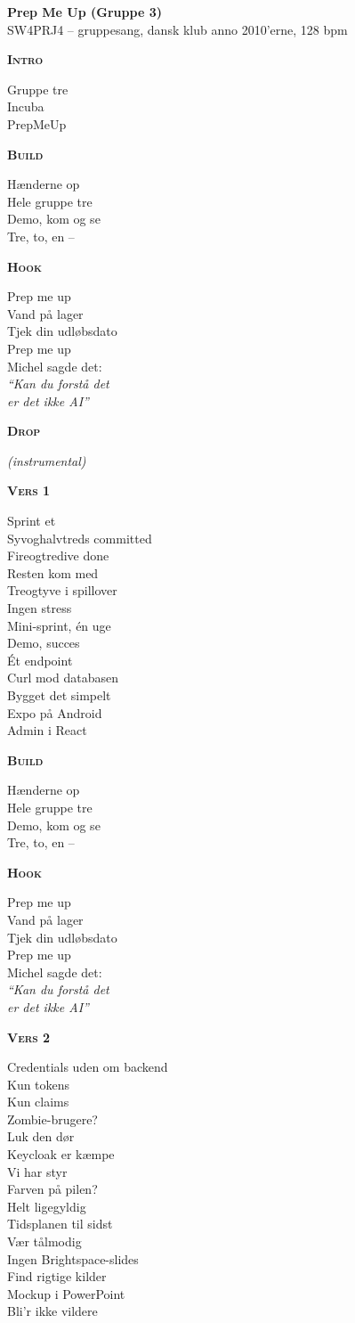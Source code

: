 \documentclass[a4paper,11pt]{article}
\newenvironment{songpart}[1]
    {\par\bigskip\noindent\begin{minipage}{\linewidth}\raggedright\textbf{\textsc{#1}}\par\smallskip}
    {\par\end{minipage}}
\newcommand{\hook}{%
\begin{songpart}{Build}
Hænderne op\\
Hele gruppe tre\\
Demo, kom og se\\
Tre, to, en --
\end{songpart}
\begin{songpart}{Hook}
Prep me up\\
Vand på lager\\
Tjek din udløbsdato\\
Prep me up\\
Michel sagde det:\\
\emph{\enquote{Kan du forstå det\\
er det ikke AI}}
\end{songpart}}
\newcommand{\drop}{%
\begin{songpart}{Drop}
\emph{(instrumental)}
\end{songpart}}
\begin{document}
\begin{center}
    {\Huge\bfseries Prep Me Up (Gruppe 3)}\\[0.4em]
    {\large SW4PRJ4 -- gruppesang, dansk klub anno 2010'erne, 128 bpm}
\end{center}

\vspace{0.5em}

\begin{multicols}{3}

\begin{songpart}{Intro}
Gruppe tre\\
Incuba\\
PrepMeUp
\end{songpart}

\hook

\drop

\begin{songpart}{Vers 1}
Sprint et\\
Syvoghalvtreds committed\\
Fireogtredive done\\
Resten kom med\\
Treogtyve i spillover\\
Ingen stress\\
Mini-sprint, én uge\\
Demo, succes\\
Ét endpoint\\
Curl mod databasen\\
Bygget det simpelt\\
Expo på Android\\
Admin i React
\end{songpart}

\hook

\begin{songpart}{Vers 2}
Credentials uden om backend\\
Kun tokens\\
Kun claims\\
Zombie-brugere?\\
Luk den dør\\
Keycloak er kæmpe\\
Vi har styr\\
Farven på pilen?\\
Helt ligegyldig\\
Tidsplanen til sidst\\
Vær tålmodig\\
Ingen Brightspace-slides\\
Find rigtige kilder\\
Mockup i PowerPoint\\
Bli'r ikke vildere
\end{songpart}


\end{multicols}
\end{document}
